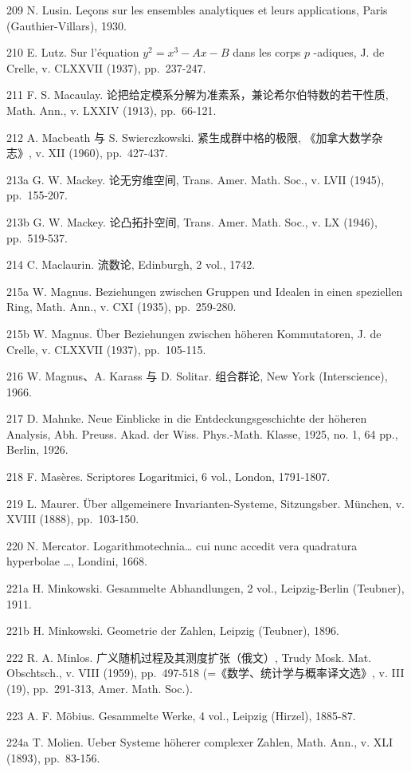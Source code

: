 209 N. Lusin. Leçons sur les ensembles analytiques et leurs applications, Paris (Gauthier-Villars), 1930.

210 E. Lutz. Sur l'équation \(y^{2} = x^{3} - Ax - B\) dans les corps \(p\) -adiques, J. de Crelle, v. CLXXVII (1937), pp.~237-247.

211 F. S. Macaulay. 论把给定模系分解为准素系，兼论希尔伯特数的若干性质, Math. Ann., v. LXXIV (1913), pp.~66-121.

212 A. Macbeath 与 S. Swierczkowski. 紧生成群中格的极限, 《加拿大数学杂志》, v. XII (1960), pp.~427-437.

213a G. W. Mackey. 论无穷维空间, Trans. Amer. Math. Soc., v. LVII (1945), pp.~155-207.

213b G. W. Mackey. 论凸拓扑空间, Trans. Amer. Math. Soc., v. LX (1946), pp.~519-537.

214 C. Maclaurin. 流数论, Edinburgh, 2 vol., 1742.

215a W. Magnus. Beziehungen zwischen Gruppen und Idealen in einen speziellen Ring, Math. Ann., v. CXI (1935), pp.~259-280.

215b W. Magnus. Über Beziehungen zwischen höheren Kommutatoren, J. de Crelle, v. CLXXVII (1937), pp.~105-115.

216 W. Magnus、A. Karass 与 D. Solitar. 组合群论, New York (Interscience), 1966.

217 D. Mahnke. Neue Einblicke in die Entdeckungsgeschichte der höheren Analysis, Abh. Preuss. Akad. der Wiss. Phys.-Math. Klasse, 1925, no. 1, 64 pp., Berlin, 1926.

218 F. Masères. Scriptores Logaritmici, 6 vol., London, 1791-1807.

219 L. Maurer. Über allgemeinere Invarianten-Systeme, Sitzungsber. München, v. XVIII (1888), pp.~103-150.

220 N. Mercator. Logarithmotechnia\ldots{} cui nunc accedit vera quadratura hyperbolae \ldots, Londini, 1668.

221a H. Minkowski. Gesammelte Abhandlungen, 2 vol., Leipzig-Berlin (Teubner), 1911.

221b H. Minkowski. Geometrie der Zahlen, Leipzig (Teubner), 1896.

222 R. A. Minlos. 广义随机过程及其测度扩张（俄文）, Trudy Mosk. Mat. Obschtsch., v. VIII (1959), pp.~497-518 (=《数学、统计学与概率译文选》, v. III (19), pp.~291-313, Amer. Math. Soc.).

223 A. F. Möbius. Gesammelte Werke, 4 vol., Leipzig (Hirzel), 1885-87.

224a T. Molien. Ueber Systeme höherer complexer Zahlen, Math. Ann., v. XLI (1893), pp.~83-156.


